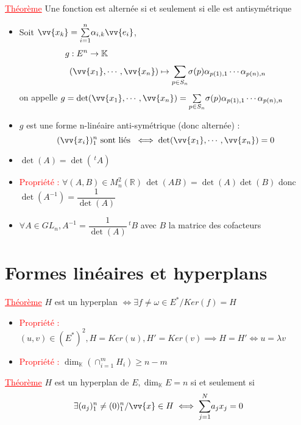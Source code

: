 \documentclass[a4paper, french]{article}
\newcommand{\R}{\mathbb{R}}
\newcommand{\K}{\mathbb{K}}
\newcommand{\al}{\alpha}
\newcommand{\la}{\lambda}
\newcommand{\som}[2]{\overset{#2}{\underset{#1}{\sum}}}
\newcommand{\thm}{\textcolor{red}{\underline{Théorème} }}
\newcommand{\ppt}{\textcolor{red}{Propriété : }}
\begin{document}
	 \thm Une fonction est alternée si et seulement si elle est antisymétrique

	\begin{itemize}[label=\(\bullet\)]
 		\item Soit $\vv{x_k}=\som{i=1}{n}\al_{i,k}\vv{e_i}$, 
			\begin{align*}
				g &: E^n \rightarrow \K \\
				&(\vv{x_1},\cdots,\vv{x_n}) \mapsto \som{p\in S_n}{}\sigma(p)\al_{p(1),1}\cdots\al_{p(n),n}
			\end{align*}
			on appelle $g=\det(\vv{x_1},\cdots,\vv{x_n})=\som{p\in S_n}{}\sigma(p)\al_{p(1),1}\cdots\al_{p(n),n}$
 		\item $g$ est une forme n-linéaire anti-symétrique (donc alternée) : $$(\vv{x_i})_1^n \text{ sont liés }\iff \det(\vv{x_1},\cdots,\vv{x_n})=0$$
 		\item $\det(A)=\det(\,^tA)$
 		\item \ppt $\forall (A,B)\in M_n^2(\R) \, \det(AB)=\det(A)\det(B)$ donc $\det(A^{-1})=\dfrac{1}{\det(A)}$
 		\item $\forall A \in GL_n, A^{-1}=\dfrac{1}{\det(A)}\,^tB$ avec $B$ la matrice des cofacteurs
	\end{itemize}

	\section{Formes linéaires et hyperplans}
	 \thm $H$ est un hyperplan $\iff \exists f \neq \omega \in E^* / Ker(f)=H$

	\begin{itemize}[label=\(\bullet\)]
 		\item \ppt $(u,v)\in (E^*)^2, H=Ker(u), H'=Ker(v) \implies H=H' \iff u=\la v$
 		\item \ppt $\dim_{\K}(\cap_{i=1}^m H_i)\geqslant n-m$
	\end{itemize}

	 \thm $H$ est un hyperplan de $E, \dim_{\K}E=n$ si et seulement si $$\exists (a_j)_1^n \neq (0)_1^n / \vv{x} \in H \iff \som{j=1}{N}a_jx_j=0$$
\end{document}
